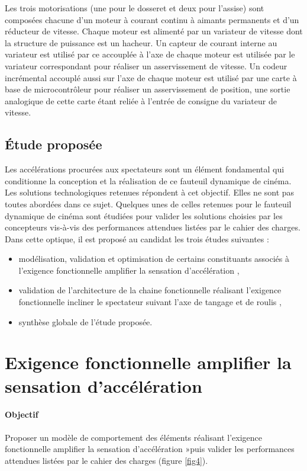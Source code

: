 Les trois motorisations (une pour le dosseret et deux pour l'assise) sont composées chacune d'un moteur à courant continu à aimants permanents et d'un réducteur de vitesse. Chaque moteur est alimenté par un variateur de vitesse dont la structure de puissance est un hacheur. Un capteur de courant interne au variateur est utilisé par ce accouplée à l'axe de chaque moteur est utilisée par le variateur correspondant pour réaliser un asservissement de vitesse. Un codeur incrémental accouplé aussi sur l'axe de chaque moteur est utilisé par une carte à base de microcontrôleur pour réaliser un asservissement de position, une sortie analogique de cette carte étant reliée à l'entrée de consigne du variateur de vitesse.

\subsection{Étude proposée}

Les accélérations procurées aux spectateurs sont un élément fondamental qui conditionne la conception et la réalisation de ce fauteuil dynamique de cinéma. Les solutions technologiques retenues répondent à cet objectif. Elles ne sont pas toutes abordées dans ce sujet. Quelques unes de celles retenues pour le fauteuil dynamique de cinéma sont étudiées pour valider les solutions choisies par les concepteurs vis-à-vis des performances attendues listées par le cahier des charges. Dans cette optique, il est proposé au candidat les trois études suivantes :
\begin{itemize}
 \item modélisation, validation et optimisation de certains constituants associés à l'exigence fonctionnelle \og amplifier la sensation d'accélération \fg,
 \item validation de l'architecture de la chaine fonctionnelle réalisant l'exigence fonctionnelle \og incliner le spectateur suivant l'axe de tangage et de roulis \fg,
 \item synthèse globale de l'étude proposée.
\end{itemize}

\section{Exigence fonctionnelle \og amplifier la sensation d'accélération \fg}

\paragraph{Objectif} Proposer un modèle de comportement des éléments réalisant l'exigence fonctionnelle \og amplifier la sensation d'accélération »\fg puis valider les performances attendues listées par le cahier des charges (figure \ref{fig4}).

